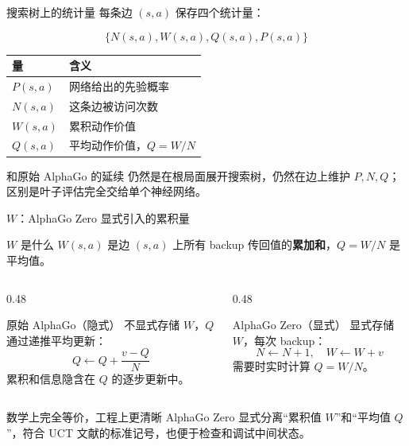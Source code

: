 \documentclass[UTF8,aspectratio=169,10pt]{ctexbeamer}
\begin{document}
\begin{frame}{搜索树上的统计量}
  每条边 $(s,a)$ 保存四个统计量：

  \[
    \{N(s,a), W(s,a), Q(s,a), P(s,a)\}
  \]

  \begin{center}
    \begin{tabular}{@{}p{}p{}@{}}
      \toprule
      量 & 含义 \\
      \midrule
      $P(s,a)$ & 网络给出的先验概率 \\
      $N(s,a)$ & 这条边被访问次数 \\
      $W(s,a)$ & 累积动作价值 \\
      $Q(s,a)$ & 平均动作价值，$Q=W/N$ \\
      \bottomrule
    \end{tabular}
  \end{center}

  \begin{block}{和原始 AlphaGo 的延续}
    仍然是在根局面展开搜索树，仍然在边上维护 $P,N,Q$；区别是叶子评估完全交给单个神经网络。
  \end{block}
\end{frame}

\begin{frame}{$W$：AlphaGo Zero 显式引入的累积量}
  \small
  \begin{block}{$W$ 是什么}
    $W(s,a)$ 是边 $(s,a)$ 上所有 backup 传回值的\textbf{累加和}，$Q=W/N$ 是平均值。
  \end{block}

  \begin{columns}[T,onlytextwidth]
    \begin{column}{0.48\textwidth}
      \begin{block}{原始 AlphaGo（隐式）}
        不显式存储 $W$，$Q$ 通过递推平均更新：
        \[
          Q \leftarrow Q + \frac{v-Q}{N}
        \]
        累积和信息隐含在 $Q$ 的逐步更新中。
      \end{block}
    \end{column}
    \begin{column}{0.48\textwidth}
      \begin{block}{AlphaGo Zero（显式）}
        显式存储 $W$，每次 backup：
        \[
          N\leftarrow N+1,\quad W\leftarrow W+v
        \]
        需要时实时计算 $Q=W/N$。
      \end{block}
    \end{column}
  \end{columns}

  \begin{alertblock}{数学上完全等价，工程上更清晰}
    AlphaGo Zero 显式分离“累积值 $W$”和“平均值 $Q$”，符合 UCT 文献的标准记号，也便于检查和调试中间状态。
  \end{alertblock}
\end{frame}
\end{document}
